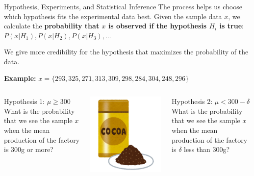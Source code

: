 \begin{frame}{Hypothesis, Experiments, and Statistical Inference}
  The  process helps us choose which hypothesis fits the experimental data best. Given the sample data $x$, we calculate the {\bf probability that $x$ is observed if the hypothesis $H_i$ is true}: $P(x|H_1), P(x|H_2), P(x|H_3), \ldots$
  \bigskip

  We give more credibility for the hypothesis that maximizes the probability of the data.\bigskip

  {\bf Example:} $x = \{293, 325, 271, 313, 309, 298, 284, 304, 248, 296\}$

  \begin{columns}
    \begin{block}{Hypothesis 1: $\mu \geq 300$}
      What is the probability that we see the sample $x$ when the mean production of the factory is 300g or more?
    \end{block}
    \includegraphics[width=\textwidth]{../img/irasutoya_cocoa}
    \begin{block}{Hypothesis 2: $\mu < 300 - \delta$}
      What is the probability that we see the sample $x$ when the mean production of the factory is $\delta$ less than 300g?
    \end{block}
  \end{columns}
\end{frame}

